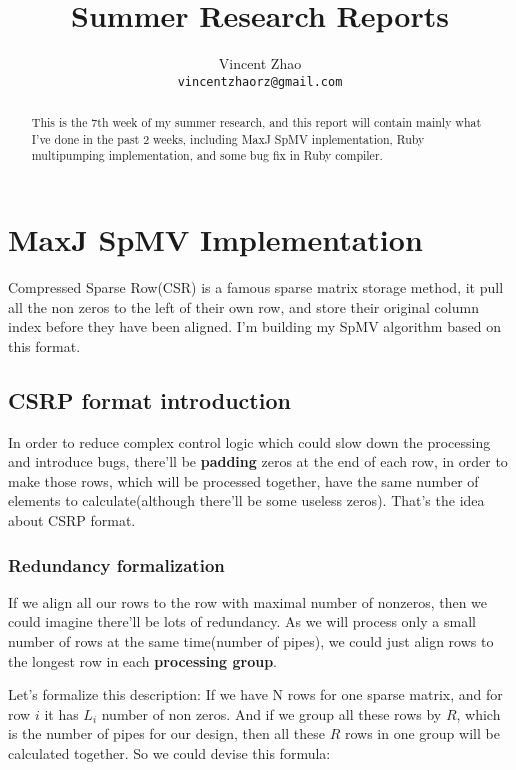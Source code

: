 \documentclass[a4paper, 10pt]{article}
\begin{document}
\title{Summer Research Reports}
\author{Vincent Zhao\\
		\texttt{vincentzhaorz@gmail.com}}
\maketitle

\begin{abstract}
This is the 7th week of my summer research, and this report will contain mainly what I've done in the past 2 weeks, including MaxJ SpMV inplementation, Ruby multipumping implementation, and some bug fix in Ruby compiler.
\end{abstract}
\newpage

\tableofcontents

\newpage

\section{MaxJ SpMV Implementation}

Compressed Sparse Row(CSR) is a famous sparse matrix storage method, it pull all the non zeros to the left of their own row, and store their original column index before they have been aligned. I'm building my SpMV algorithm based on this format. 

\subsection{CSRP format introduction}
In order to reduce complex control logic which could slow down the processing and introduce bugs, there'll be \textbf{padding} zeros at the end of each row, in order to make those rows, which will be processed together, have the same number of elements to calculate(although there'll be some useless zeros). That's the idea about CSRP format.

\subsubsection{Redundancy formalization}

If we align all our rows to the row with maximal number of nonzeros, then we could imagine there'll be lots of redundancy. As we will process only a small number of rows at the same time(number of pipes), we could just align rows to the longest row in each \textbf{processing group}.

Let's formalize this description: If we have N rows for one sparse matrix, and for row $i$ it has $L_i$ number of non zeros. And if we group all these rows by $R$, which is the number of pipes for our design, then all these $R$ rows in one group will be calculated together. So we could devise this formula:
\end{document}
